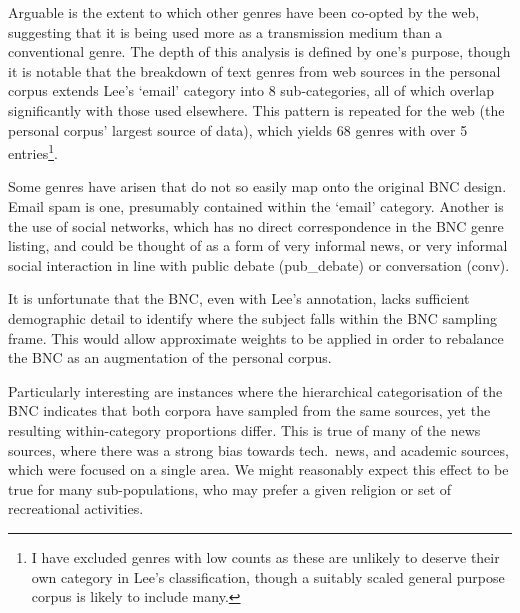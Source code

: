 Arguable is the extent to which other genres have been co-opted by the web, suggesting that it is being used more as a transmission medium than a conventional genre.  The depth of this analysis is defined by one's purpose, though it is notable that the breakdown of text genres from web sources in the personal corpus extends Lee's `email' category into 8 sub-categories, all of which overlap significantly with those used elsewhere.  This pattern is repeated for the web (the personal corpus' largest source of data), which yields 68 genres with over 5 entries\footnote{I have excluded genres with low counts as these are unlikely to deserve their own category in Lee's classification, though a suitably scaled general purpose corpus is likely to include many.}.

Some genres have arisen that do not so easily map onto the original BNC design.  Email spam is one, presumably contained within the `email' category.  Another is the use of social networks, which has no direct correspondence in the BNC genre listing, and could be thought of as a form of very informal news, or very informal social interaction in line with public debate (pub\_debate) or conversation (conv).









It is unfortunate that the BNC, even with Lee's annotation, lacks sufficient demographic detail to identify where the subject falls within the BNC sampling frame.  This would allow approximate weights to be applied in order to rebalance the BNC as an augmentation of the personal corpus.


Particularly interesting are instances where the hierarchical categorisation of the BNC indicates that both corpora have sampled from the same sources, yet the resulting within-category proportions differ.  This is true of many of the news sources, where there was a strong bias towards tech.\ news, and academic sources, which were focused on a single area.  We might reasonably expect this effect to be true for many sub-populations, who may prefer a given religion or set of recreational activities.  

